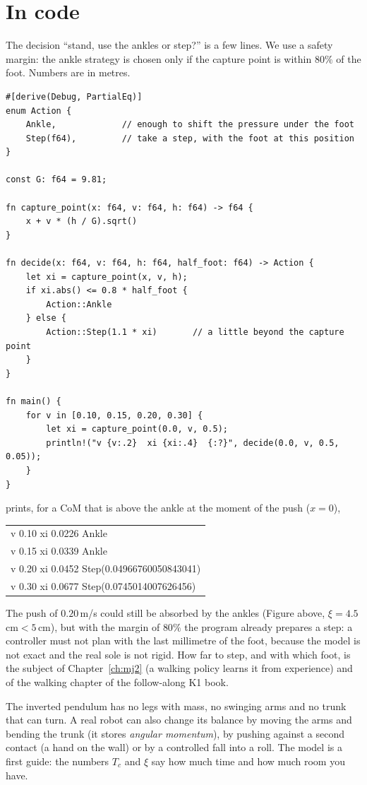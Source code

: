 \section*{In code}
The decision ``stand, use the ankles or step?'' is a few lines. We use a safety margin: the ankle strategy is chosen only if the capture point is within $80\%$ of the foot. Numbers are in metres.
\begin{verbatim}
#[derive(Debug, PartialEq)]
enum Action {
    Ankle,             // enough to shift the pressure under the foot
    Step(f64),         // take a step, with the foot at this position
}

const G: f64 = 9.81;

fn capture_point(x: f64, v: f64, h: f64) -> f64 {
    x + v * (h / G).sqrt()
}

fn decide(x: f64, v: f64, h: f64, half_foot: f64) -> Action {
    let xi = capture_point(x, v, h);
    if xi.abs() <= 0.8 * half_foot {
        Action::Ankle
    } else {
        Action::Step(1.1 * xi)       // a little beyond the capture point
    }
}

fn main() {
    for v in [0.10, 0.15, 0.20, 0.30] {
        let xi = capture_point(0.0, v, 0.5);
        println!("v {v:.2}  xi {xi:.4}  {:?}", decide(0.0, v, 0.5, 0.05));
    }
}
\end{verbatim}
prints, for a CoM that is above the ankle at the moment of the push ($x=0$),
\begin{center}\small\ttfamily
\begin{tabular}{@{}l@{}}
v 0.10  xi 0.0226  Ankle\\
v 0.15  xi 0.0339  Ankle\\
v 0.20  xi 0.0452  Step(0.04966760050843041)\\
v 0.30  xi 0.0677  Step(0.0745014007626456)
\end{tabular}
\end{center}
The push of $0.20$\,m/s could still be absorbed by the ankles (Figure above, $\xi=4.5$\,cm$<5$\,cm), but with the margin of $80\%$ the program already prepares a step: a controller must not plan with the last millimetre of the foot, because the model is not exact and the real sole is not rigid. How far to step, and with which foot, is the subject of Chapter~\ref{ch:mj2} (a walking policy learns it from experience) and of the walking chapter of the follow-along K1 book.

\begin{keyidea}
The inverted pendulum has no legs with mass, no swinging arms and no trunk that can turn. A real robot can also change its balance by moving the arms and bending the trunk (it stores \emph{angular momentum}), by pushing against a second contact (a hand on the wall) or by a controlled fall into a roll. The model is a first guide: the numbers $T_c$ and $\xi$ say how much time and how much room you have.
\end{keyidea}

